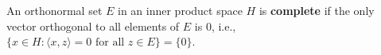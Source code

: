 An orthonormal set $E$ in an inner product space $H$ is \textbf{complete} if the only vector orthogonal to all elements of $E$ is $0$, i.e., $\{x \in H : \langle x, z \rangle = 0 \text{ for all } z \in E\} = \{0\}$.
